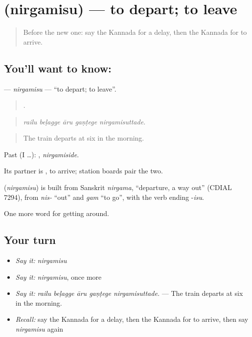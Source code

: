 \section[\texorpdfstring{\kn{ನಿರ್ಗಮಿಸು} (nirgamisu)}{ನಿರ್ಗಮಿಸು (nirgamisu)}]{ (nirgamisu) — to depart; to leave}

\label{lesson:KA-C434-nirgamisu}



\begin{quote}
Before the new one: say the Kannada for a delay, then the Kannada for to arrive.
\end{quote}

\subsection*{You'll want to know: }
\textbf{} — \emph{nirgamisu} — \textquotedblleft{}to depart; to leave\textquotedblright{}.

\begin{quote}
    .
\end{quote}

\begin{quote}
\emph{railu beḷagge āru gaṇṭege nirgamisuttade.}
\end{quote}

\begin{quote}
The train departs at six in the morning.
\end{quote}

Past (I …): , \emph{nirgamiside}.

Its partner is , to arrive; station boards pair the two.

\begin{cousinweb}
\textbf{} (\emph{nirgamisu}) is built from Sanskrit \emph{nirgama}, \textquotedblleft{}departure, a way out\textquotedblright{} (CDIAL 7294), from \emph{nis-} \textquotedblleft{}out\textquotedblright{} and \emph{gam} \textquotedblleft{}to go\textquotedblright{}, with the verb ending -\emph{isu}.
\end{cousinweb}

\begin{grammarlens}[title={What you've built}]
One more word for getting around.
\end{grammarlens}

\subsection*{Your turn}
\begin{itemize}
\raggedright
  \item \emph{Say it:} \emph{nirgamisu}
  \item \emph{Say it:} \emph{nirgamisu}, once more
  \item \emph{Say it:} \emph{railu beḷagge āru gaṇṭege nirgamisuttade.} — The train departs at six in the morning.
  \item \emph{Recall:} say the Kannada for a delay, then the Kannada for to arrive, then say \emph{nirgamisu} again
\end{itemize}

